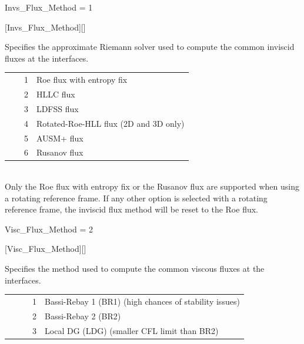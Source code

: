 
\begin{nmldescitem}
Invs_Flux_Method = 1
\end{nmldescitem}
[Invs\_Flux\_Method][]

\begin{nmldescbody}
Specifies the approximate Riemann solver used to compute the common inviscid
fluxes at the interfaces.
\\
\begin{tabular}{ @{\qquad} r @{ = } p{0.85\linewidth} @{} }
    1 & Roe flux\cite{Roe_1981} with entropy fix\cite{Huynh_1995} \\
    2 & HLLC flux\cite{Toro_1994} \\
    3 & LDFSS flux\cite{Edwards_1997} \\
    4 & Rotated-Roe-HLL flux\cite{Nishikawa_2008} (2D and 3D only) \\
    5 & AUSM+ flux\cite{Liou_1996} \\
    6 & Rusanov flux\cite{Rusanov_1961}
\end{tabular}\\
%
\NOTE
Only the Roe flux with entropy fix or the Rusanov flux are supported
when using a rotating reference frame. If any other option is selected
with a rotating reference frame, the inviscid flux method will be reset to
the Roe flux.

\end{nmldescbody}


\begin{nmldescitem}
Visc_Flux_Method = 2
\end{nmldescitem}
[Visc\_Flux\_Method][]

\begin{nmldescbody}
Specifies the method used to compute the common viscous fluxes at the
interfaces.
\\
\begin{tabular}{ @{\qquad} r @{ = } p{0.85\linewidth} @{} }
  1 & Bassi-Rebay 1 (BR1)\cite{Bassi_1997} (high chances of stability issues) \\
  2 & Bassi-Rebay 2 (BR2)\cite{Bassi_2005} \\
  3 & Local DG (LDG)\cite{Cockburn_1998} (smaller CFL limit than BR2)
\end{tabular}
\end{nmldescbody}

